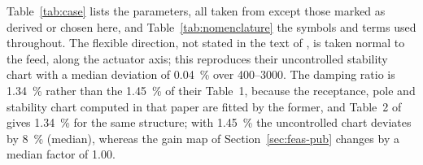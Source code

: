 Table~\ref{tab:case} lists the parameters, all taken from \citet{ozsoy2026robust} except those marked as derived or chosen here, and Table~\ref{tab:nomenclature} the symbols and terms used throughout. The flexible direction, not stated in the text of \citet{ozsoy2026robust}, is taken normal to the feed, along the actuator axis; this reproduces their uncontrolled stability chart with a median deviation of \SI{0.04}{\percent} over \SIrange{400}{3000}{\rpm}. The damping ratio is \SI{1.34}{\percent} rather than the \SI{1.45}{\percent} of their Table~1, because the receptance, pole and stability chart computed in that paper are fitted by the former, and Table~2 of \citet{ozsoy2025frequency} gives \SI{1.34}{\percent} for the same structure; with \SI{1.45}{\percent} the uncontrolled chart deviates by \SI{8}{\percent} (median), whereas the gain map of Section~\ref{sec:feas-pub} changes by a median factor of 1.00.

